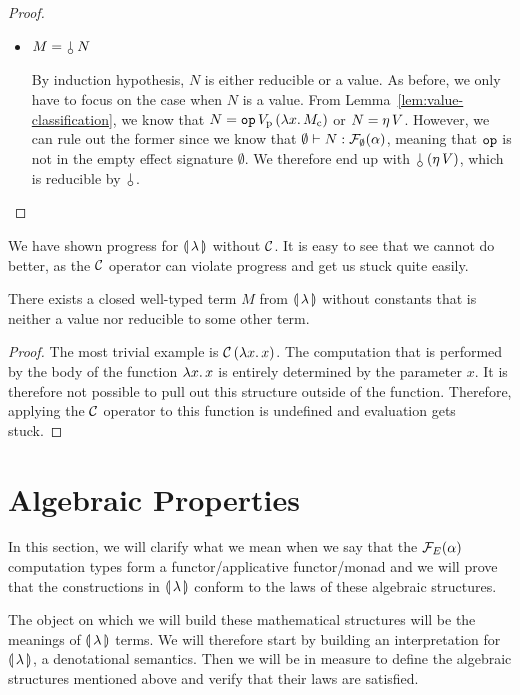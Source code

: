 \begin{proof}
\begin{itemize}
  \item $M = \ap{\cherry}{N}$

    By induction hypothesis, $N$ is either reducible or a value. As before,
    we only have to focus on the case when $N$ is a value. From
    Lemma~\ref{lem:value-classification}, we know that
    $N = \mathtt{op}\,V_{\mathrm{p}}\,(\lambda x.\, M_{\mathrm{c}})$ or $N =
    \eta\,V$. However, we can rule out the former since we know that
    $\emptyset \vdash N : \mathcal{F}_\emptyset(\alpha)$, meaning that $\mathtt{op}$ is
    not in the empty effect signature $\emptyset$. We therefore end up with
    $\ap{\cherry}{(\etaE{V})}$, which is reducible by $\cherry$.
  \end{itemize}
\end{proof}

We have shown progress for $\llparenthesis \, \lambda \, \rrparenthesis$ without $\mathcal{C}$. It is easy to
see that we cannot do better, as the $\mathcal{C}$ operator can violate progress
and get us stuck quite easily.

\begin{observation}
  There exists a closed well-typed term $M$ from $\llparenthesis \, \lambda \, \rrparenthesis$ without
  constants that is neither a value nor reducible to some other term.
\end{observation}

\begin{proof}
  The most trivial example is $\mathcal{C}\,(\lambda x.\, x)$. The computation
  that is performed by the body of the function $\lambda x.\, x$ is entirely
  determined by the parameter $x$. It is therefore not possible to pull out
  this structure outside of the function. Therefore, applying the $\mathcal{C}$
  operator to this function is undefined and evaluation gets stuck.
\end{proof}


\section{Algebraic Properties}
\label{sec:algebraic-properties}

In this section, we will clarify what we mean when we say that the
$\mathcal{F}_E(\alpha)$ computation types form a functor/applicative functor/monad
and we will prove that the constructions in $\llparenthesis \, \lambda \, \rrparenthesis$ conform to
the laws of these algebraic structures.

The object on which we will build these mathematical structures will be the
meanings of $\llparenthesis \, \lambda \, \rrparenthesis$ terms. We will therefore start by building
an interpretation for $\llparenthesis \, \lambda \, \rrparenthesis$, a denotational semantics. Then we
will be in measure to define the algebraic structures mentioned above and
verify that their laws are satisfied.


